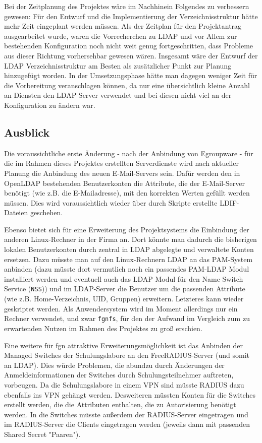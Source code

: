 \documentclass[11pt,a4paper,titlepage=firstiscover,headsepline,bibtotoc]{scrartcl} %
\begin{document}
Bei der Zeitplanung des Projektes wäre im Nachhinein Folgendes zu verbessern gewesen: Für den Entwurf und die Implementierung der Verzeichnisstruktur hätte mehr Zeit eingeplant werden müssen. Als der Zeitplan für den Projektantrag ausgearbeitet wurde, waren die Vorrecherchen zu LDAP und vor Allem zur bestehenden Konfiguration noch nicht weit genug fortgeschritten, dass Probleme aus dieser Richtung vorhersehbar gewesen wären. Insgesamt wäre der Entwurf der LDAP Verzeichnisstruktur am Besten als zusätzlicher Punkt zur Planung hinzugefügt worden. In der Umsetzungsphase hätte man dagegen weniger Zeit für die Vorbereitung veranschlagen können, da nur eine übersichtlich kleine Anzahl an Diensten den-LDAP Server verwendet und bei diesen nicht viel an der Konfiguration zu ändern war.

\subsection{Ausblick}
Die voraussichtliche erste Änderung - nach der Anbindung von Egroupware - für die im Rahmen dieses Projektes erstellten Serverdienste wird nach aktueller Planung die Anbindung des neuen E-Mail-Servers sein. Dafür werden den in OpenLDAP bestehenden Benutzerkonten die Attribute, die der E-Mail-Server benötigt (wie z.B. die E-Mailadresse), mit den korrekten Werten gefüllt werden müssen. Dies wird voraussichtlich wieder über durch Skripte erstellte LDIF-Dateien geschehen.

Ebenso bietet sich für eine Erweiterung des Projektsystems die Einbindung der anderen Linux-Rechner in der Firma an. Dort könnte man dadurch die bisherigen lokalen Benutzerkonten durch zentral in LDAP abgelegte und verwaltete Konten ersetzen. Dazu müsste man auf den Linux-Rechnern LDAP an das PAM-System anbinden (dazu müsste dort vermutlich noch ein passendes PAM-LDAP Modul installiert werden und eventuell auch das LDAP Modul für den Name Switch Service (\texttt{NSS})) und im LDAP-Server die Benutzer um die passenden Attribute (wie z.B. Home-Verzeichnis, UID, Gruppen) erweitern. Letzteres kann wieder geskriptet werden. Als Anwendersystem wird im Moment allerdings nur ein Rechner verwendet, und zwar \texttt{fgnfs}, für den der Aufwand im Vergleich zum zu erwartenden Nutzen im Rahmen des Projektes zu groß erschien.

Eine weitere für fgn attraktive Erweiterungsmöglichkeit ist das Anbinden der Managed Switches der Schulungslabore an den FreeRADIUS-Server (und somit an LDAP). Dies würde Problemen, die abundzu durch Änderungen der Anmeldeinformationen der Switches durch Schulungsteilnehmer auftreten, vorbeugen. Da die Schulungslabore in einem VPN sind müsste RADIUS dazu ebenfalls ins VPN gehängt werden. Desweiteren müssten Konten für die Switches erstellt werden, die die Attributen enthalten, die zu Autorisierung benötigt werden. In die Switches müsste außerdem der RADIUS-Server eingetragen und im RADIUS-Server die Clients eingetragen werden (jeweils dann mit passenden Shared Secret "Paaren").
\end{document}

